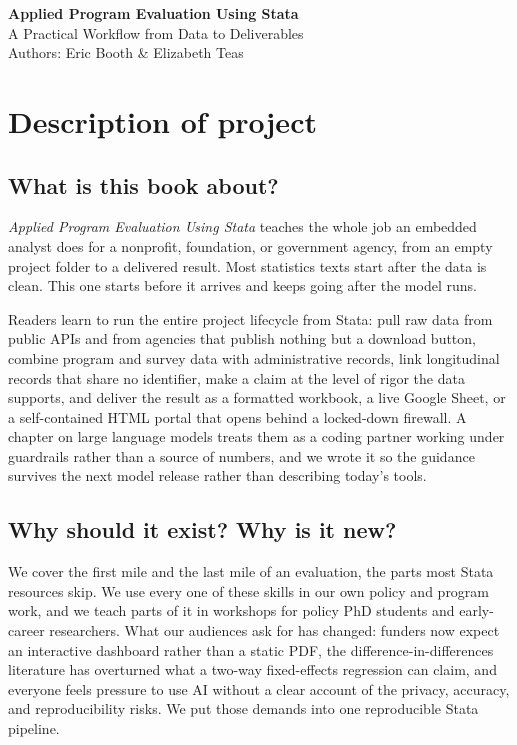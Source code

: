 \documentclass[11pt]{article}
\begin{document}
{\LARGE\bfseries\color{txnavy} Applied Program Evaluation Using Stata}\\[2pt]
{\large\color{txnavy} A Practical Workflow from Data to Deliverables}\\[6pt]

Authors: Eric Booth \& Elizabeth Teas

\section*{Description of project}

\subsection*{What is this book about?}
\textit{Applied Program Evaluation Using Stata} teaches the whole job an embedded analyst does for a nonprofit, foundation, or government agency, from an empty project folder to a delivered result. Most statistics texts start after the data is clean. This one starts before it arrives and keeps going after the model runs.

Readers learn to run the entire project lifecycle from Stata: pull raw data from public APIs and from agencies that publish nothing but a download button, combine program and survey data with administrative records, link longitudinal records that share no identifier, make a claim at the level of rigor the data supports, and deliver the result as a formatted workbook, a live Google Sheet, or a self-contained HTML portal that opens behind a locked-down firewall. A chapter on large language models treats them as a coding partner working under guardrails rather than a source of numbers, and we wrote it so the guidance survives the next model release rather than describing today's tools.

\subsection*{Why should it exist? Why is it new?}
We cover the first mile and the last mile of an evaluation, the parts most Stata resources skip. We use every one of these skills in our own policy and program work, and we teach parts of it in workshops for policy PhD students and early-career researchers. What our audiences ask for has changed: funders now expect an interactive dashboard rather than a static PDF, the difference-in-differences literature has overturned what a two-way fixed-effects regression can claim, and everyone feels pressure to use AI without a clear account of the privacy, accuracy, and reproducibility risks. We put those demands into one reproducible Stata pipeline.
\end{document}

